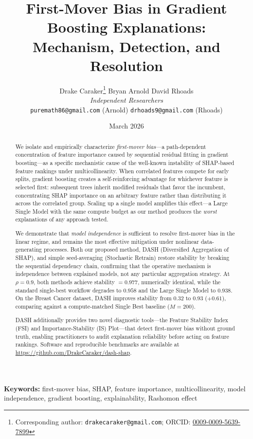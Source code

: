 \documentclass[11pt]{article}
\title{%
  \textbf{First-Mover Bias in Gradient Boosting Explanations:} \\[6pt]
  \large Mechanism, Detection, and Resolution
}
\author{
  Drake Caraker\thanks{Corresponding author: \texttt{drakecaraker@gmail.com}; ORCID: \href{https://orcid.org/0009-0009-5639-7899}{0009-0009-5639-7899}} \quad
  Bryan Arnold \quad
  David Rhoads \\[4pt]
  \textit{Independent Researchers} \\[2pt]
  \small\texttt{puremath86@gmail.com} (Arnold) \quad
  \small\texttt{drhoads9@gmail.com} (Rhoads)
}
\date{March 2026}
\newcommand{\dash}{\textsc{DASH}}
\newcommand{\rhovar}{\rho}
\begin{document}
\maketitle

\begin{abstract}
We isolate and empirically characterize \emph{first-mover bias}---a
path-dependent concentration of feature importance caused by sequential
residual fitting in gradient boosting---as a specific mechanistic cause of the
well-known instability of SHAP-based feature rankings under
multicollinearity. When correlated features
compete for early splits, gradient boosting creates a self-reinforcing
advantage for whichever feature is selected first: subsequent trees inherit
modified residuals that favor the incumbent, concentrating SHAP importance on
an arbitrary feature rather than distributing it across the correlated group.
Scaling up a single model amplifies this effect---a Large Single Model with
the same compute budget as our method produces the \emph{worst} explanations
of any approach tested.

We demonstrate that \emph{model independence} is sufficient to resolve
first-mover bias in the linear regime, and remains the most effective
mitigation under nonlinear data-generating processes. Both our proposed
method, \dash{} (Diversified Aggregation of SHAP), and simple seed-averaging
(Stochastic Retrain) restore stability by breaking the sequential dependency
chain, confirming that the operative mechanism is independence between
explained models, not any particular aggregation strategy. At $\rhovar = 0.9$, both methods achieve stability
$= 0.977$, numerically identical, while the standard
single-best workflow degrades to $0.958$ and the Large Single Model to
$0.938$. On the Breast Cancer dataset, \dash{} improves stability from
$0.32$ to $0.93$ ($+0.61$), comparing against a compute-matched
Single Best baseline ($M{=}200$).

\dash{} additionally provides two novel diagnostic tools---the Feature
Stability Index (FSI) and Importance-Stability (IS) Plot---that detect
first-mover bias without ground truth, enabling practitioners to audit
explanation reliability before acting on feature rankings. Software and
reproducible benchmarks are available at
\url{https://github.com/DrakeCaraker/dash-shap}.
\end{abstract}

\smallskip
\noindent\textbf{Keywords:} first-mover bias, SHAP, feature importance,
multicollinearity, model independence, gradient boosting, explainability,
Rashomon effect
\end{document}

